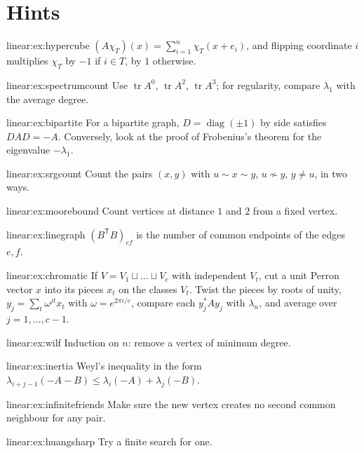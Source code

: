 \section{Hints}

\begin{hint}{linear:ex:hypercube}
$(A\chi_T)(x)=\sum_{i=1}^n\chi_T(x+e_i)$, and flipping coordinate $i$ multiplies $\chi_T$ by $-1$ if $i\in T$, by $1$ otherwise.
\end{hint}
\begin{hint}{linear:ex:spectrumcount}
Use $\operatorname{tr}A^0$, $\operatorname{tr}A^2$, $\operatorname{tr}A^3$; for regularity, compare $\lambda_1$ with the average degree.
\end{hint}
\begin{hint}{linear:ex:bipartite}
For a bipartite graph, $D=\operatorname{diag}(\pm1)$ by side satisfies $DAD=-A$. Conversely, look at the proof of Frobenius's
theorem for the eigenvalue $-\lambda_1$.
\end{hint}
\begin{hint}{linear:ex:srgcount}
Count the pairs $(x,y)$ with $u\sim x\sim y$, $u\not\sim y$, $y\ne u$, in two ways.
\end{hint}
\begin{hint}{linear:ex:moorebound}
Count vertices at distance $1$ and $2$ from a fixed vertex.
\end{hint}
\begin{hint}{linear:ex:linegraph}
$(B^{\mathsf T}B)_{ef}$ is the number of common endpoints of the edges $e,f$.
\end{hint}
\begin{hint}{linear:ex:chromatic}
If $V=V_1\sqcup\dots\sqcup V_c$ with independent $V_t$, cut a unit Perron vector $x$ into its pieces $x_t$ on the classes $V_t$.
Twist the pieces by roots of unity, $y_j=\sum_t\omega^{jt}x_t$ with $\omega=e^{2\pi i/c}$, compare each $y_j^*Ay_j$ with $\lambda_n$,
and average over $j=1,\dots,c-1$.
\end{hint}
\begin{hint}{linear:ex:wilf}
Induction on $n$: remove a vertex of minimum degree.
\end{hint}
\begin{hint}{linear:ex:inertia}
Weyl's inequality in the form $\lambda_{i+j-1}(-A-B)\le\lambda_i(-A)+\lambda_j(-B)$.
\end{hint}
\begin{hint}{linear:ex:infinitefriends}
Make sure the new vertex creates no second common neighbour for any pair.
\end{hint}
\begin{hint}{linear:ex:huangsharp}
Try a finite search for one.
\end{hint}

